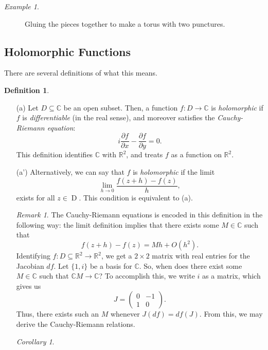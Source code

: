 \documentclass[a4paper]{report}
\theoremstyle{definition}
\newtheorem{definition}{Definition}
\theoremstyle{remark}
\newtheorem{remark}{Remark}
\theoremstyle{proposition}
\theoremstyle{conjecture}
\theoremstyle{lemma}
\theoremstyle{corollary}
\newtheorem{corollary}{Corollary}
\theoremstyle{exercise}
\theoremstyle{example}
\newtheorem{example}{Example}
\newcommand{\C}{\mathbb{C}}
\newcommand{\on}{\operatorname}
\newcommand{\D}{\on{D}}
\begin{document}
\begin{example}
\begin{figure}[h!]
        \caption{Gluing the pieces together to make a torus with two 
        punctures.}
    \end{figure}
\end{example}

\subsection{Holomorphic Functions}

There are several definitions of what this means.

\begin{definition}
    \leavevmode
    \begin{itemize}
        \item[(a)] Let $D\subseteq \C$ be an open subset. Then, a function 
            $f : D \to \C$ is \emph{holomorphic} if $f$ is \emph{differentiable}
            (in the real sense), and moreover satisfies
            the \emph{Cauchy-Riemann equation}:
            $$i\frac{\partial f}{\partial x} - \frac{\partial f}{\partial y}=0.$$
            This definition identifies $\C$ with $\mathbb{R}^2$, and treats
            $f$ as a function on $\mathbb{R}^2$.
        \item[(a')] Alternatively, we can say that $f$ is \emph{holomorphic} 
            if the limit $$\lim_{h\to0} \frac{f(z+h)-f(z)}{h},$$
            exists for all $z\in \D$. This condition is equivalent to (a).
            \begin{remark}
                The Cauchy-Riemann equations is encoded in this definition
                in the following way:
                the limit definition implies that there exists some $M\in\C$ 
                such that $$f(z+h)-f(z) = Mh + O(h^2).$$
                Identifying $f : D\subseteq \mathbb{R}^2 \to \mathbb{R}^2$, 
                we get a $2\times 2$ matrix with real entries for the Jacobian
                $df$. Let $\lbrace 1,i\rbrace$ be a basis for $\C$.
                So, when does there exist some $M\in \C$ such that 
                $\C M \to \C$? To accomplish this, we write $i$ as a matrix,
                which gives us $$J = \begin{pmatrix}
                    0&-1\\
                    1&0
                \end{pmatrix}.$$
                Thus, there exists such an $M$ whenever $J(df) = df(J)$.
                From this, we may derive the Cauchy-Riemann relations.
                \begin{corollary}

\end{corollary}
\end{remark}
\end{itemize}
\end{definition}
\end{document}
